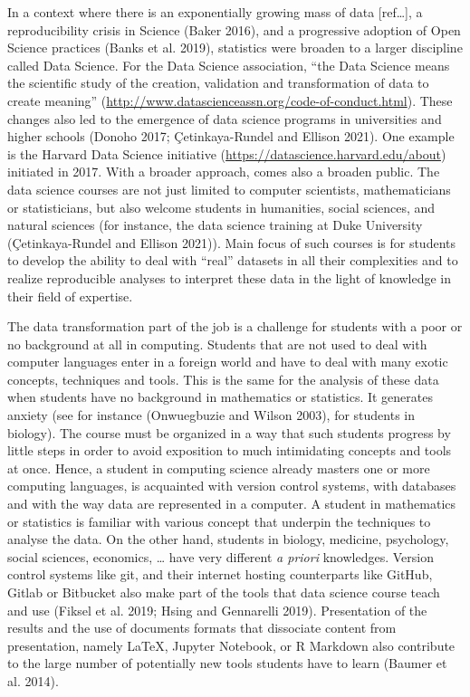 \documentclass[
]{article}
\begin{document}
In a context where there is an exponentially growing mass of data
{[}ref\ldots{]}, a reproducibility crisis in Science (Baker 2016), and a
progressive adoption of Open Science practices (Banks et al. 2019),
statistics were broaden to a larger discipline called Data Science. For
the Data Science association, ``the Data Science means the scientific
study of the creation, validation and transformation of data to create
meaning'' (\url{http://www.datascienceassn.org/code-of-conduct.html}).
These changes also led to the emergence of data science programs in
universities and higher schools (Donoho 2017; Çetinkaya-Rundel and
Ellison 2021). One example is the Harvard Data Science initiative
(\url{https://datascience.harvard.edu/about}) initiated in 2017. With a
broader approach, comes also a broaden public. The data science courses
are not just limited to computer scientists, mathematicians or
statisticians, but also welcome students in humanities, social sciences,
and natural sciences (for instance, the data science training at Duke
University (Çetinkaya-Rundel and Ellison 2021)). Main focus of such
courses is for students to develop the ability to deal with ``real''
datasets in all their complexities and to realize reproducible analyses
to interpret these data in the light of knowledge in their field of
expertise.

The data transformation part of the job is a challenge for students with
a poor or no background at all in computing. Students that are not used
to deal with computer languages enter in a foreign world and have to
deal with many exotic concepts, techniques and tools. This is the same
for the analysis of these data when students have no background in
mathematics or statistics. It generates anxiety (see for instance
(Onwuegbuzie and Wilson 2003), for students in biology). The course must
be organized in a way that such students progress by little steps in
order to avoid exposition to much intimidating concepts and tools at
once. Hence, a student in computing science already masters one or more
computing languages, is acquainted with version control systems, with
databases and with the way data are represented in a computer. A student
in mathematics or statistics is familiar with various concept that
underpin the techniques to analyse the data. On the other hand, students
in biology, medicine, psychology, social sciences, economics, \ldots{}
have very different \emph{a priori} knowledges. Version control systems
like git, and their internet hosting counterparts like GitHub, Gitlab or
Bitbucket also make part of the tools that data science course teach and
use (Fiksel et al. 2019; Hsing and Gennarelli 2019). Presentation of the
results and the use of documents formats that dissociate content from
presentation, namely LaTeX, Jupyter Notebook, or R Markdown also
contribute to the large number of potentially new tools students have to
learn (Baumer et al. 2014).
\end{document}
